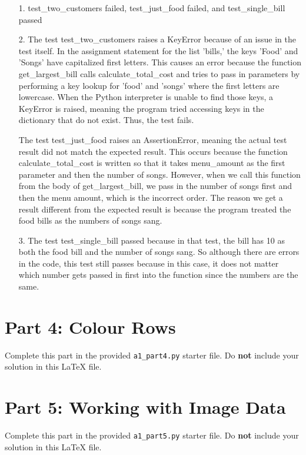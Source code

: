 \documentclass[12pt]{article}
\begin{document}

\begin{enumerate}
\item[1.]
test\_two\_customers failed, test\_just\_food failed, and test\_single\_bill passed

\item[2.]
The test test\_two\_customers raises a KeyError because of an issue in the test itself. In the assignment statement for the list 'bills,' the keys 'Food' and 'Songs' have capitalized first letters. This causes an error because the function get\_largest\_bill calls calculate\_total\_cost and tries to pass in parameters by performing a key lookup for 'food' and 'songs' where the first letters are lowercase. When the Python interpreter is unable to find those keys, a KeyError is raised, meaning the program tried accessing keys in the dictionary that do not exist. Thus, the test fails. 

The test test\_just\_food raises an AssertionError, meaning the actual test result did not match the expected result. This occurs because the function calculate\_total\_cost is written so that it takes menu\_amount as the first parameter and then the number of songs. However, when we call this function from the body of get\_largest\_bill, we pass in the number of songs first and then the menu amount, which is the incorrect order. The reason we get a result different from the expected result is because the program treated the food bills as the numbers of songs sang. 

\item[3.]
The test test\_single\_bill passed because in that test, the bill has 10 as both the food bill and the number of songs sang. So although there are errors in the code, this test still passes because in this case, it does not matter which number gets passed in first into the function since the numbers are the same. 
\end{enumerate}

\section*{Part 4: Colour Rows}

Complete this part in the provided \texttt{a1\_part4.py} starter file.
Do \textbf{not} include your solution in this LaTeX file.

\section*{Part 5: Working with Image Data}

Complete this part in the provided \texttt{a1\_part5.py} starter file.
Do \textbf{not} include your solution in this LaTeX file.
\end{document}
